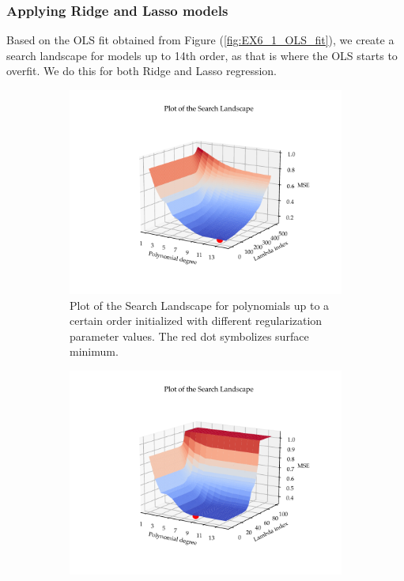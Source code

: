 \documentclass[11pt, a4paper]{article}
\begin{document}
\subsubsection*{Applying Ridge and Lasso models}
Based on the OLS fit obtained from Figure (\ref{fig:EX6_1_OLS_fit}), we create a search landscape for models up to 14th order, as that is where the OLS starts to overfit. We do this for both Ridge and Lasso regression.  

\begin{figure}
  \centering
  \begin{subfigure}{0.49\textwidth}
      \centering
      \hspace*{-3.8cm}
      \includegraphics[width=\textwidth]{figures/EX6_search_landscape_ridge.pdf}
      \caption{\label{fig:ridge_search_land_terrain}Plot of the Search Landscape for polynomials up to a certain order initialized with different regularization parameter values. The red dot symbolizes surface minimum.}
  \end{subfigure}
  \hfill
  \begin{subfigure}{0.49\textwidth}
    \centering
    \hspace*{-3.8cm}
    \includegraphics[width=\textwidth]{figures/EX6_search_landscape_lasso.pdf}

\end{subfigure}
\end{figure}
\end{document}
